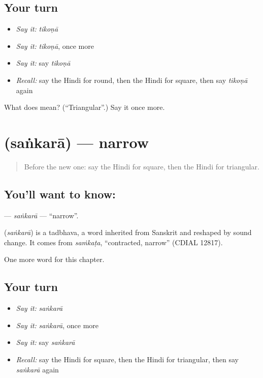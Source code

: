 \subsection*{Your turn}
\begin{itemize}
\raggedright
  \item \emph{Say it:} \emph{tikoṇā}
  \item \emph{Say it:} \emph{tikoṇā}, once more
  \item \emph{Say it:} say \emph{tikoṇā}
  \item \emph{Recall:} say the Hindi for round, then the Hindi for square, then say \emph{tikoṇā} again
\end{itemize}

\begin{tcolorbox}[breakable,colback=teal!4,colframe=teal!35!black,title={Before you move on}]
What does  mean? (\textquotedblleft{}Triangular\textquotedblright{}.) Say it once more.
\end{tcolorbox}
\section[\texorpdfstring{\hi{संकरा} (saṅkarā)}{संकरा (saṅkarā)}]{ (saṅkarā) — narrow}

\label{lesson:HI-C237-sankara}



\begin{quote}
Before the new one: say the Hindi for square, then the Hindi for triangular.
\end{quote}

\subsection*{You'll want to know: }
\textbf{} — \emph{saṅkarā} — \textquotedblleft{}narrow\textquotedblright{}.

\begin{cousinweb}
\textbf{} (\emph{saṅkarā}) is a tadbhava, a word inherited from Sanskrit and reshaped by sound change. It comes from \emph{saṁkaṭa}, \textquotedblleft{}contracted, narrow\textquotedblright{} (CDIAL 12817).
\end{cousinweb}

\begin{grammarlens}[title={What you've built}]
One more word for this chapter.
\end{grammarlens}

\subsection*{Your turn}
\begin{itemize}
\raggedright
  \item \emph{Say it:} \emph{saṅkarā}
  \item \emph{Say it:} \emph{saṅkarā}, once more
  \item \emph{Say it:} say \emph{saṅkarā}
  \item \emph{Recall:} say the Hindi for square, then the Hindi for triangular, then say \emph{saṅkarā} again
\end{itemize}

